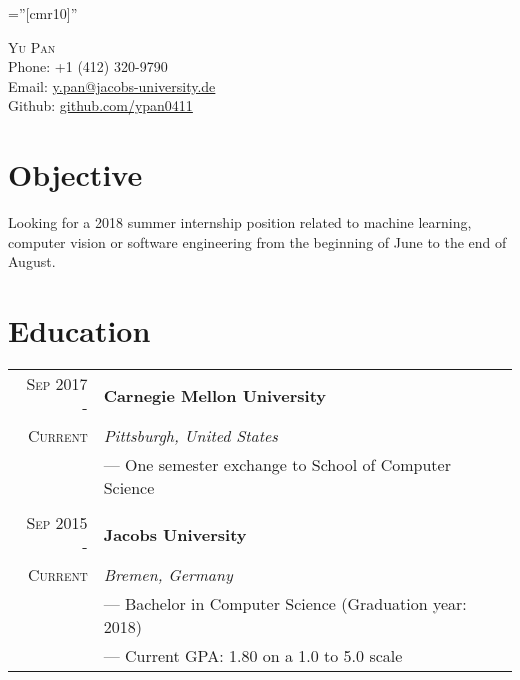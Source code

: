 \documentclass[a4paper,10pt]{article}
\begin{document}
	
	
	\pagestyle{empty} %
	
	\font\fb=''[cmr10]'' %
	
	\par{\centering
		{\huge{\textsc{Yu Pan}}}\\
		Phone: +1 (412) 320-9790 \\
		Email: \href{mailto:y.pan@jacobs-university.de}{y.pan@jacobs-university.de}\\
		Github: \href{https://github.com/ypan0411}{github.com/ypan0411} \par}
	
	\section{Objective}
	Looking for a 2018 summer internship position related to machine learning, computer vision or software engineering from the beginning of June to the end of August.
	
	
	\section{Education}
	\begin{tabular}{r|l}
	    \textsc{Sep 2017 - } & \textbf{Carnegie Mellon University} \\\textsc{Current}&\emph{Pittsburgh, United States}
		\\& --- One semester exchange to School of Computer Science
		\\ \multicolumn{1}{c}{} \\
		\textsc{Sep 2015 - } & \textbf{Jacobs University} \\\textsc{Current}&\emph{Bremen, Germany}
		\\& --- Bachelor in Computer Science (Graduation year: 2018)
		\\& --- Current GPA: 1.80 on a 1.0 to 5.0 scale
	\end{tabular}
	
\end{document}
